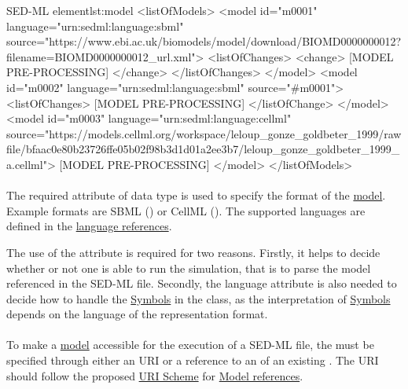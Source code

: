 \begin{myXmlLst}{SED-ML  element}{lst:model}
<listOfModels>
	<model id="m0001" language="urn:sedml:language:sbml" 
		source="https://www.ebi.ac.uk/biomodels/model/download/BIOMD0000000012?filename=BIOMD0000000012_url.xml">
		<listOfChanges>
			<change>
				[MODEL PRE-PROCESSING]
			</change>
		</listOfChanges> 
	</model>
	<model id="m0002" language="urn:sedml:language:sbml" source="#m0001">
		<listOfChanges>
			[MODEL PRE-PROCESSING]
		</listOfChange>
	</model>
	<model id="m0003" language="urn:sedml:language:cellml" source="https://models.cellml.org/workspace/leloup_gonze_goldbeter_1999/rawfile/bfaac0e80b23726ffe05b02f98b3d1d01a2ee3b7/leloup_gonze_goldbeter_1999_a.cellml">
		[MODEL PRE-PROCESSING]
	</model>
</listOfModels>
\end{myXmlLst} 

\paragraph*{}
\label{sec:language}
The required  attribute of data type \hyperref[type:urn]{} is used to specify the format of the \hyperref[class:model]{model}. Example formats are SBML () or CellML (). The supported languages are defined in the \hyperref[sec:languageURN]{language references}.

The use of the  attribute is required for two reasons. Firstly, it helps to decide whether or not one is able to run the simulation, that is to parse the model referenced in the SED-ML file. Secondly, the language attribute is also needed to decide how to handle the \hyperref[sec:implicitVariable]{Symbols} in the \Variable class, as the interpretation of \hyperref[sec:implicitVariable]{Symbols} depends on the language of the representation format.


\paragraph*{}
\label{sec:model_source}
To make a \hyperref[class:model]{model} accessible for the execution of a SED-ML file, the  must be specified through either an URI or a reference to an  of an existing \Model. The URI should follow the proposed \hyperref[sec:uriScheme]{URI Scheme} for \hyperref[sec:modelURI]{Model references}.

